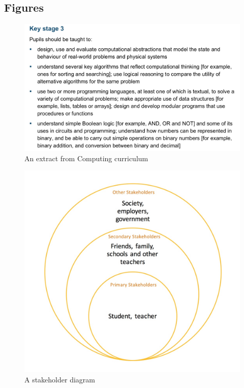 \documentclass[a4wide, 11pt]{article}
\begin{document}
\subsection{Figures}

\begin{figure}[h]
  \includegraphics[scale=0.25]{curriculum_extract.jpeg}
  \centering
  \caption{An extract from Computing curriculum}
\end{figure}

\begin{figure}[h]
  \includegraphics[scale=0.25]{stakeholders.jpeg}
  \centering
  \caption{A stakeholder diagram}
\end{figure}
\end{document}

